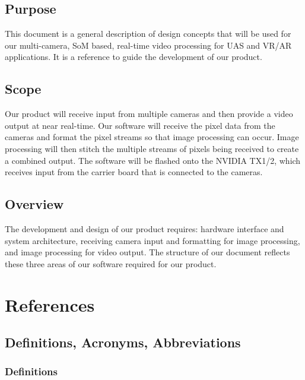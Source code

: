 \documentclass[letterpaper,10pt,serif,draftclsnofoot,onecolumn,compsoc,titlepage]{IEEEtran}
\begin{document}
\subsection{Purpose}

This document is a general description of design concepts that will be used for our 
multi-camera, SoM based, real-time video processing for UAS and VR/AR applications. 
It is a reference to guide the development of our product.  \\

\subsection{Scope}

Our product will receive input from multiple cameras and then provide a video output at 
near real-time. Our software will receive the pixel data from the cameras and format 
the pixel streams so that image processing can occur. Image processing will then stitch 
the multiple streams of pixels being received to create a combined output. The software 
will be flashed onto the NVIDIA TX1/2, which receives input from the carrier 
board that is connected to the cameras. \\

\subsection{Overview}

The development and design of our product requires: hardware interface and system 
architecture, receiving camera input and formatting for image processing, and image 
processing for video output. The structure of our document reflects these three areas 
of our software required for our product. \\ 

\newpage
\section{References}




\subsection{Definitions, Acronyms, Abbreviations}

\subsubsection{Definitions}
\end{document}
